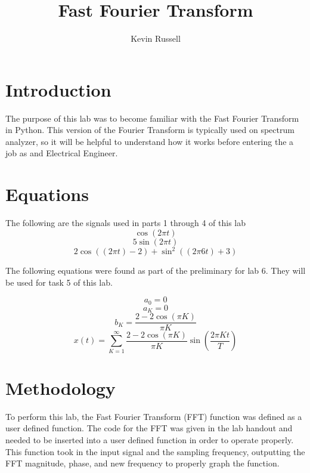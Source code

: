 \documentclass[12pt, titlepage]{article}
\author{Kevin Russell}
\title{Fast Fourier Transform}
\date{\parbox{\linewidth}{\centering%
  \experimentDate
  \endgraf\bigskip
  \className\ -- Section \sectionNumber\
}}
\begin{document}
 \newpage
	    \maketitle
\newpage
    \tableofcontents
    
\newpage
    \section{Introduction}    
    The purpose of this lab was to become familiar with the Fast Fourier Transform in Python.  This version of the Fourier Transform is typically used on spectrum analyzer, so it will be helpful to understand how it works before entering the a job as and Electrical Engineer.
    
    \section{Equations}
    
    The following are the signals used in parts 1 through 4 of this lab
    \begin{equation}
        \cos{(2\pi t)}
    \end{equation}
    \begin{equation}
        5\sin{(2\pi t)}
    \end{equation}
    \begin{equation}
        2\cos{((2\pi t)-2)}+\sin^2{((2\pi 6t)+3)}
    \end{equation}
    
    
    The following equations were found as part of the preliminary for lab 6.  They will be used for task 5 of this lab.
    
     \begin{equation}
           a_0=0
           \nonumber
       \end{equation}
       \begin{equation}
           a_K=0
           \nonumber
       \end{equation}
       \begin{equation}
           b_K=\frac{2-2\cos{(\pi K)}}{\pi K}
           \nonumber
       \end{equation}
       \begin{equation}
           x(t)=\sum_{K=1}^{\infty}\frac{2-2\cos{(\pi K)}}{\pi K}\sin{(\frac{2\pi Kt}{T})}
       \end{equation}
    
    \section{Methodology}
    To perform this lab, the Fast Fourier Transform (FFT) function was defined as a user defined function.  The code for the FFT was given in the lab handout and needed to be inserted into a user defined function in order to operate properly.  This function took in the input signal and the sampling frequency, outputting the FFT magnitude, phase, and new frequency to properly graph the function.
    
\end{document}

